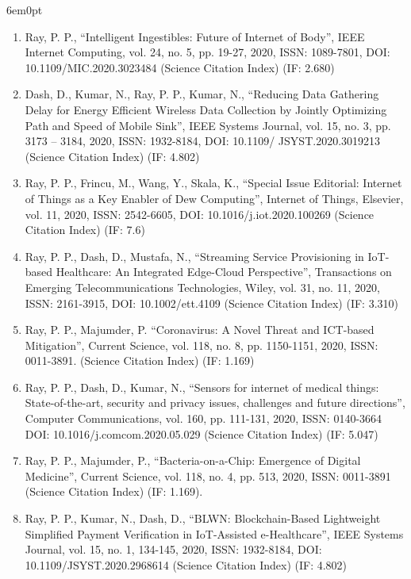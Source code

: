 \documentclass[11pt,a4paper]{moderncv}
\begin{document}
\begin{adjustwidth}{6em}{0pt}
\begin{enumerate}
		\item Ray, P. P., “Intelligent Ingestibles: Future of Internet of Body”, IEEE Internet Computing, vol. 24, no. 5, pp. 19-27, 2020, ISSN: 1089-7801, DOI: 10.1109/MIC.2020.3023484 (Science Citation Index) (IF: 2.680) 
		
		\item Dash, D., Kumar, N., Ray, P. P., Kumar, N., “Reducing Data Gathering Delay for Energy Efficient Wireless Data Collection by Jointly Optimizing Path and Speed of Mobile Sink”, IEEE Systems Journal, vol. 15, no. 3, pp. 3173 – 3184, 2020, ISSN: 1932-8184, DOI: 10.1109/ JSYST.2020.3019213 (Science Citation Index) (IF: 4.802)
		
		\item Ray, P. P., Frincu, M., Wang, Y., Skala, K., “Special Issue Editorial: Internet of Things as a Key Enabler of Dew Computing”, Internet of Things, Elsevier, vol. 11, 2020, ISSN: 2542-6605, DOI: 10.1016/j.iot.2020.100269 (Science Citation Index) (IF: 7.6)
		
		\item Ray, P. P., Dash, D., Mustafa, N., “Streaming Service Provisioning in IoT-based Healthcare: An Integrated Edge-Cloud Perspective”, Transactions on Emerging Telecommunications Technologies, Wiley, vol. 31, no. 11, 2020, ISSN: 2161-3915, DOI: 10.1002/ett.4109 (Science Citation Index) (IF: 3.310) 
		
		\item Ray, P. P., Majumder, P. “Coronavirus: A Novel Threat and ICT-based Mitigation”, Current Science, vol. 118, no. 8, pp. 1150-1151, 2020, ISSN: 0011-3891. (Science Citation Index) (IF: 1.169)
		
		\item Ray, P. P., Dash, D., Kumar, N., “Sensors for internet of medical things: State-of-the-art, security and privacy issues, challenges and future directions”, Computer Communications, vol. 160, pp. 111-131, 2020, ISSN: 0140-3664 DOI: 10.1016/j.comcom.2020.05.029 (Science Citation Index) (IF: 5.047) 
		
		\item Ray, P. P., Majumder, P., “Bacteria-on-a-Chip: Emergence of Digital Medicine”, Current Science, vol. 118, no. 4, pp. 513, 2020, ISSN: 0011-3891 (Science Citation Index) (IF: 1.169). 
		
		\item Ray, P. P., Kumar, N., Dash, D., “BLWN: Blockchain-Based Lightweight Simplified Payment Verification in IoT-Assisted e-Healthcare”, IEEE Systems Journal, vol. 15, no. 1, 134-145, 2020, ISSN: 1932-8184, DOI: 10.1109/JSYST.2020.2968614 (Science Citation Index) (IF: 4.802) 
		

\end{enumerate}
\end{adjustwidth}
\end{document}
